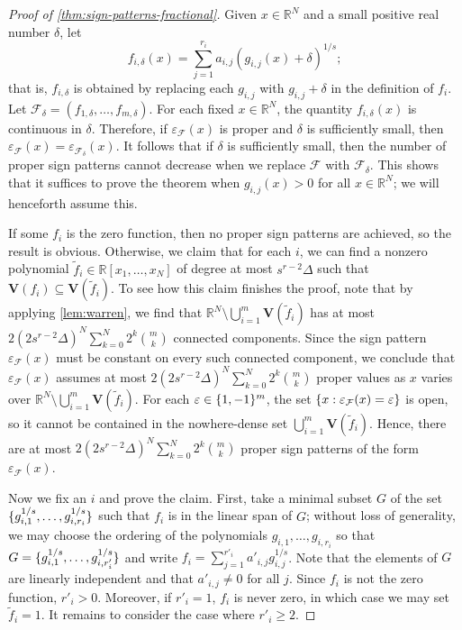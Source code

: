 \documentclass[11pt]{amsart}
\theoremstyle{definition}
\DeclarePairedDelimiter{\set}{\{}{\}}
\newcommand{\calf}{\mathcal{F}}
\newcommand{\eps}{\varepsilon}
\newcommand{\RR}{\mathbb{R}}
\newcommand{\VV}{\mathbf{V}}
\begin{document}
\begin{proof}[Proof of \cref{thm:sign-patterns-fractional}]
Given $x\in\RR^N$ and a small positive real number $\delta$, let \[f_{i,\delta}(x)=\sum_{j=1}^{r_i}a_{i,j}(g_{i,j}(x)+\delta)^{1/s};\] that is, $f_{i,\delta}$ is obtained by replacing each $g_{i,j}$ with $g_{i,j} + \delta$ in the definition of $f_i$. Let $\calf_\delta=(f_{1,\delta},\ldots,f_{m,\delta})$. For each fixed $x \in \RR^N$, the quantity $f_{i,\delta}(x)$ is continuous in $\delta$. Therefore, if $\eps_\calf(x)$ is proper and $\delta$ is sufficiently small, then $\eps_\calf(x)=\eps_{\calf_\delta}(x)$. It follows that if $\delta$ is sufficiently small, then the number of proper sign patterns cannot decrease when we replace $\calf$ with $\calf_\delta$. This shows that it suffices to prove the theorem when $g_{i,j}(x) > 0$ for all $x \in \RR^N$; we will henceforth assume this.

If some $f_i$ is the zero function, then no proper sign patterns are achieved, so the result is obvious. Otherwise, we claim that for each $i$, we can find a nonzero polynomial $\tilde f_i \in \RR[x_1,\ldots,x_N]$ of degree at most $s^{r-2} \Delta$ such that $\VV(f_i) \subseteq \VV(\tilde f_i)$. To see how this claim finishes the proof, note that by applying \cref{lem:warren}, we find that $\RR^N \setminus \bigcup_{i=1}^m \VV(\tilde f_i)$ has at most 
$2(2s^{r-2}\Delta)^N\sum_{k=0}^N 2^k \binom{m}{k}$
connected components. Since the sign pattern $\eps_\calf(x)$ must be constant on every such connected component, we conclude that $\eps_\calf(x)$ assumes at most $2(2s^{r-2}\Delta)^N\sum_{k=0}^N 2^k \binom{m}{k}$ proper values as $x$ varies over $\RR^N \setminus \bigcup_{i=1}^m \VV(\tilde f_i)$. For each $\eps\in\set{1,-1}^m$, the set $\set{x : \eps_\calf(x) = \eps}$ is open, so it cannot be contained in the nowhere-dense set $\bigcup_{i=1}^m \VV(\tilde f_i)$. Hence, there are at most $2(2s^{r-2}\Delta)^N\sum_{k=0}^N 2^k \binom{m}{k}$ proper sign patterns of the form $\eps_\calf(x)$.

Now we fix an $i$ and prove the claim. First, take a minimal subset $G$ of the set $\set{g_{i,1}^{1/s}, \ldots, g_{i,r_i}^{1/s}}$ such that $f_i$ is in the linear span of $G$; without loss of generality, we may choose the ordering of the polynomials $g_{i,1},\ldots,g_{i,r_i}$ so that $G = \set{g_{i,1}^{1/s},\ldots,g_{i,r'_i}^{1/s}}$ and write $f_i = \sum_{j=1}^{r'_i} a'_{i,j} g_{i,j}^{1/s}$. Note that the elements of $G$ are linearly independent and that $a'_{i,j} \neq 0$ for all $j$. Since $f_i$ is not the zero function, $r'_i > 0$. Moreover, if $r'_i = 1$, $f_i$ is never zero, in which case we may set $\tilde f_i  = 1$. It remains to consider the case where $r'_i \geq 2$.


\end{proof}
\end{document}
